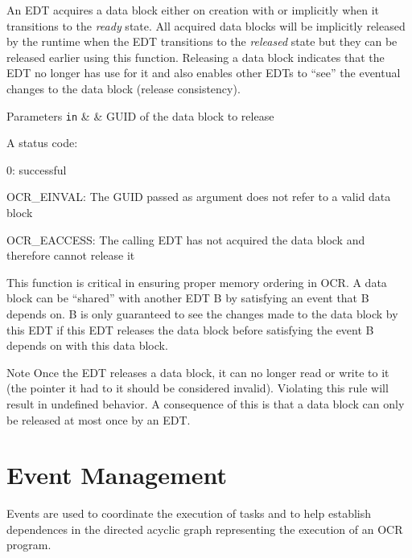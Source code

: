 An EDT acquires a data block either on creation with \hyperlink{func_ocrDbCreate}{}
or implicitly when it transitions to the \emph{ready} state. All acquired data blocks
will be implicitly released by the runtime when the EDT transitions to the
\emph{released} state but they can be released earlier using this function.
Releasing a data block indicates that the EDT no longer has use for it and also
enables other EDTs to ``see'' the eventual changes to the data block (release consistency).

\begin{DoxyParams}[1]{Parameters}
\mbox{\tt in}  &  & GUID of the data block to release\\
\hline
\end{DoxyParams}

\returns
A status code:
\begin{DoxyItemize}
\item 0: successful
\item OCR\_EINVAL: The GUID passed as argument does not refer to a
  valid data block
\item OCR\_EACCESS: The calling EDT has not acquired the data block
  and therefore cannot release it
\end{DoxyItemize}

\descr
This function is critical in ensuring proper memory ordering in OCR. A data block
can be ``shared'' with another EDT B by satisfying an event that B depends on. B
is only guaranteed to see the changes made to the data block by this EDT if this
EDT releases the data block before satisfying the event B depends on with this
data block.

\begin{DoxyNote}{Note}
Once the EDT releases a data block, it can no longer read or write to it (the
pointer it had to it should be considered invalid). Violating this rule will
result in undefined behavior. A consequence of this is that a data block can
only be released at most once by an EDT.
\end{DoxyNote}
\section{Event Management}
\label{sec:OCREventManagement}

Events are used to coordinate the execution of tasks and to
help establish dependences in the directed acyclic graph representing the
execution of an OCR program.

